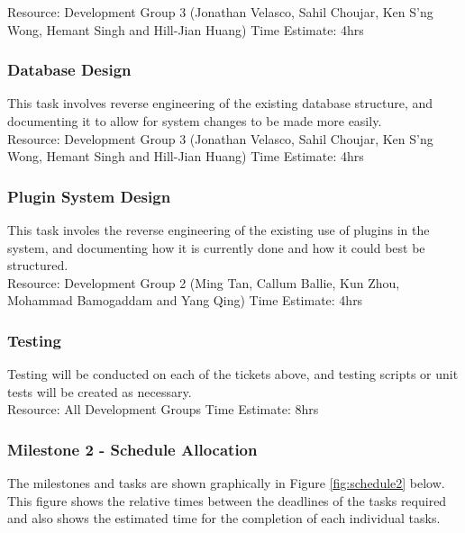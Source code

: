 \documentclass{article}
\begin{document}
	Resource: Development Group 3 (Jonathan Velasco, Sahil Choujar, Ken S'ng Wong, Hemant Singh and Hill-Jian Huang)
	Time Estimate: 4hrs
	
\subsubsection{Database Design}
	This task involves reverse engineering of the existing database structure, and documenting it to allow for system changes to be made more easily.\\
	
	Resource: Development Group 3 (Jonathan Velasco, Sahil Choujar, Ken S'ng Wong, Hemant Singh and Hill-Jian Huang)
	Time Estimate: 4hrs

\subsubsection{Plugin System Design}
	This task involes the reverse engineering of the existing use of plugins in the system, and documenting how it is currently done and how it could best be structured.\\
	
	Resource: Development Group 2 (Ming Tan, Callum Ballie, Kun Zhou, Mohammad Bamogaddam and Yang Qing)
	Time Estimate: 4hrs
	
\subsubsection{Testing}
	Testing will be conducted on each of the tickets above, and testing scripts or unit tests will be created as necessary.\\
	
	Resource: All Development Groups
	Time Estimate: 8hrs

\subsubsection{Milestone 2 - Schedule Allocation}

The milestones and tasks are shown graphically in Figure \ref{fig:schedule2} below. This figure shows the relative times between the deadlines of the tasks required and also shows the estimated time for the completion of each individual tasks.\\
\end{document}
